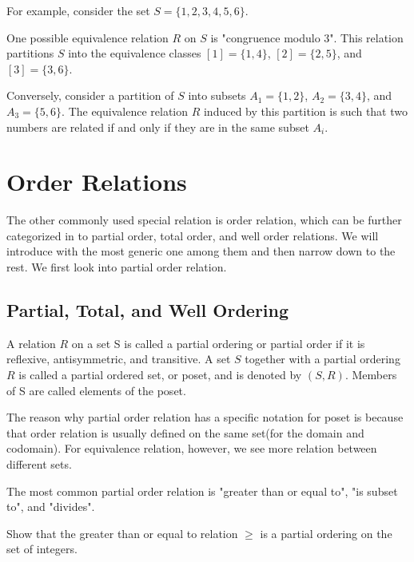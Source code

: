 \begin{example}
	For example, consider the set \( S = \{1, 2, 3, 4, 5, 6\} \). 
	
	One possible equivalence relation \( R \) on \( S \) is "congruence modulo 3". This relation partitions \( S \) into the equivalence classes \( [1] = \{1, 4\} \), \( [2] = \{2, 5\} \), and \( [3] = \{3, 6\} \).
	
	Conversely, consider a partition of \( S \) into subsets \( A_1 = \{1, 2\} \), \( A_2 = \{3, 4\} \), and \( A_3 = \{5, 6\} \). The equivalence relation \( R \) induced by this partition is such that two numbers are related if and only if they are in the same subset \( A_i \).
\end{example}

\section{Order Relations}
The other commonly used special relation is order relation, which can be further categorized in to partial order, total order, and well order relations. We will
introduce with the most generic one among them and then narrow down to the rest. We first look into partial order relation.
\subsection{Partial, Total, and Well Ordering}
\begin{definition}
    A relation $R$ on a set S is called a partial ordering or partial order if it is reflexive, antisymmetric, and transitive. A set $S$ together with a partial ordering $R$ is 
    called a partial ordered set, or poset, and is denoted by $(S,R)$. Members of S are called elements of the poset.
\end{definition}
\begin{remark}
    The reason why partial order relation has a specific notation for poset is because that order relation is usually defined on the same set(for the domain and codomain). For 
    equivalence relation, however, we see more relation between different sets.
\end{remark}

The most common partial order relation is "greater than or equal to", "is subset to", and "divides".
\begin{example}
    Show that the greater than or equal to relation $\geq$ is a partial ordering on the set of integers.
\end{example}
    

